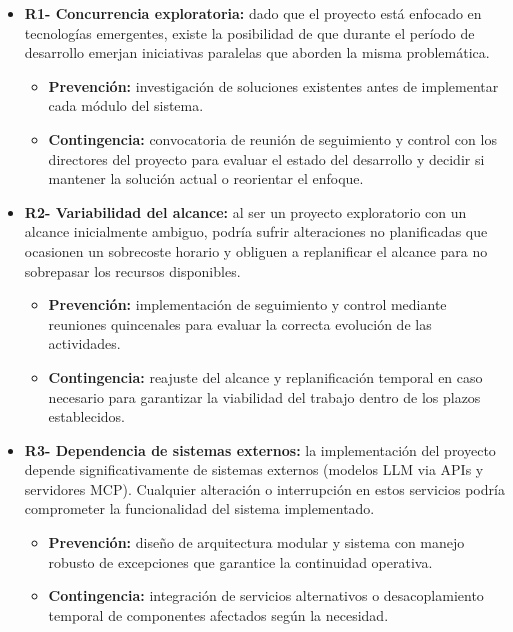 \begin{itemize}
  \item\textbf{R1- Concurrencia exploratoria: }dado que el proyecto está enfocado en tecnologías emergentes, existe la posibilidad de que durante el período de desarrollo emerjan iniciativas paralelas que aborden la misma problemática.
  \begin{itemize}
    \item \textbf{Prevención: }investigación de soluciones existentes antes de implementar cada módulo del sistema.
    \item \textbf{Contingencia: }convocatoria de reunión de seguimiento y control con los directores del proyecto para evaluar el estado del desarrollo y decidir si mantener la solución actual o reorientar el enfoque.
  \end{itemize}
  
  \item\textbf{R2- Variabilidad del alcance: }al ser un proyecto exploratorio con un alcance inicialmente ambiguo, podría sufrir alteraciones no planificadas que ocasionen un sobrecoste horario y obliguen a replanificar el alcance para no sobrepasar los recursos disponibles.
  \begin{itemize}
    \item \textbf{Prevención: }implementación de seguimiento y control mediante reuniones quincenales para evaluar la correcta evolución de las actividades.
    \item \textbf{Contingencia: }reajuste del alcance y replanificación temporal en caso necesario para garantizar la viabilidad del trabajo dentro de los plazos establecidos.
  \end{itemize}
  
  \item\textbf{R3- Dependencia de sistemas externos: }la implementación del proyecto depende significativamente de sistemas externos (modelos LLM via APIs y servidores MCP). Cualquier alteración o interrupción en estos servicios podría comprometer la funcionalidad del sistema implementado.
  \begin{itemize}
    \item \textbf{Prevención: }diseño de arquitectura modular y sistema con manejo robusto de excepciones que garantice la continuidad operativa.
  \item \textbf{Contingencia: }integración de servicios alternativos o desacoplamiento temporal de componentes afectados según la necesidad.
  \end{itemize}
  

\end{itemize}
